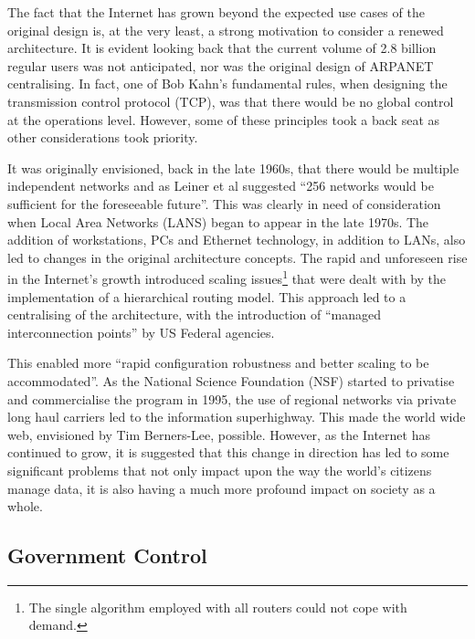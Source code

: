 \documentclass[twocolumn,english]{article}
\begin{document}
The fact that the Internet has grown beyond the expected use cases of the original design is, at the very least, a strong motivation to consider a renewed architecture. It is evident looking back that the current volume of
2.8 billion regular users\cite{mwg13} was not anticipated, nor was the original design of ARPANET centralising. In fact, one of Bob Kahn\textquoteright s fundamental rules, when designing the transmission control protocol (TCP), was that there would be no global control at the operations level\cite{isocBriefHistory}. However, some of these principles took a back seat as other considerations took priority.

It was originally envisioned, back in the late 1960s,
that there would be multiple independent networks and as Leiner et
al suggested \textquotedblleft 256 networks would be sufficient
for the foreseeable future''. This was clearly in need of consideration
when Local Area Networks (LANS) began to appear in the late 1970s. The addition of workstations, PCs and Ethernet technology, in addition to LANs, also led to changes in the original architecture
concepts. The rapid and unforeseen rise in the Internet\textquoteright s
growth introduced scaling issues\footnote{The single algorithm employed with
all routers could not cope with demand.} that were dealt with by the
implementation of a hierarchical routing model. This approach led to
a centralising of the architecture, with the introduction
of \textquotedblleft managed interconnection points\textquotedblright{}
by US Federal agencies. 

This enabled more \textquotedblleft rapid configuration robustness
and better scaling to be accommodated\textquotedblright. As the National Science Foundation (NSF) started to privatise and
commercialise the program in 1995, the use of regional networks via
private long haul carriers led to the information superhighway.  This made the world wide web, envisioned
by Tim Berners-Lee, possible. However, as the
Internet has continued to grow, it is suggested that this change in
direction has led to some significant problems that not only impact
upon the way the world\textquoteright s citizens manage data, it is also
having a much more profound impact on society as a whole. 


\subsection{Government Control}
\end{document}

